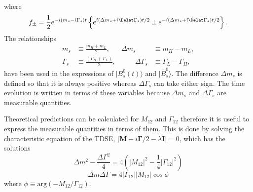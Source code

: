 {%
where 
\begin{equation}
f_{\pm} = \frac{1}{2} e^{-i(m_s - i\Gamma_s)t} \left \{ e^{i(\Delta m_s + i \Delat\Gamma_s)t/2} \pm e^{-i(\Delta m_s + i \Delat\Gamma_s)t/2} \right \}.
\end{equation}
The relationships
\begin{align}
m_s &\equiv \frac{m_H + m_L}{2}, &  \Delta m_s &\equiv m_H - m_L,\\
\Gamma_s &\equiv \frac{(\Gamma_H + \Gamma_L)}{2}, & \qquad \Delta \Gamma_s &\equiv \Gamma_L - \Gamma_H,
\label{eq:deltas}
\end{align}
have been used in the expressions of $|B^{0}_{s}(t)\rangle$ and $|\overline{B}^{0}_{s} \rangle$. The difference $\Delta m_s$ is defined so that it is always positive whereas $\Delta\Gamma_s$ can take either sign. The time evolution is written in terms of these variables because $\Delta m_s$ and $\Delta\Gamma_s$ are measurable quantities.

Theoretical predictions can be calculated for $M_{12}$ and $\Gamma_{12}$ therefore it is useful to express the measurable quantities in terms of them. This is done by solving the characteristic equation of the TDSE, $|\mathbf{M} - i \mathbf{\Gamma}/2 - \lambda \mathbf{I}| = 0$, which has the solutions
\begin{equation}
\Delta m^2 - \frac{\Delta\Gamma^2}{4} = 4(|M_{12}|^2 - \frac{1}{4} |\Gamma_{12}|^2) 
\end{equation}
\begin{equation}
\Delta m \Delta \Gamma = 4 |\Gamma_{12}| |M_{12}| \cos \phi
\end{equation}
where $\phi \equiv \mathrm{arg}(-M_{12}/\Gamma_{12})$.

}
